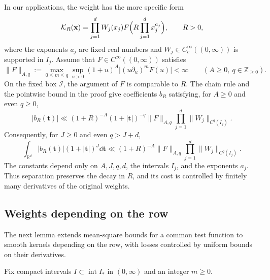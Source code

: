 In our applications, the weight has the more specific form
\[
 \mathcal K_R(\mathbf x)=\prod_{j=1}^dW_j(x_j)
 F\Bigl(R\prod_{j=1}^d x_j^{a_j}\Bigr),\qquad R>0,
\]
where the exponents $a_j$ are fixed real numbers and
$W_j\in C_c^\infty((0,\infty))$ is supported in $I_j$.
Assume that $F\in C^\infty((0,\infty))$ satisfies
\[
 \|F\|_{A,q}:=\max_{0\le m\le q}\sup_{u>0}
 (1+u)^A\bigl|(u\partial_u)^mF(u)\bigr|<\infty
 \qquad(A\ge0,\ q\in\mathbb Z_{\ge0}).
\]
On the fixed box $\mathcal I$, the argument of $F$ is comparable
to $R$. The chain rule and the pointwise bound in the proof give
coefficients $b_R$ satisfying, for $A\ge0$ and even $q\ge0$,
\begin{equation}\label{eq:smooth-pointwise}
 |b_R(\mathbf t)|
 \ll (1+R)^{-A}(1+|\mathbf t|)^{-q}\|F\|_{A,q}
       \prod_{j=1}^d\|W_j\|_{C^q(I_j)}.
\end{equation}
Consequently, for $J\ge0$ and even $q>J+d$,
\begin{equation}\label{eq:smooth-weight-bound}
 \int_{\mathbb R^d}|b_R(\mathbf t)|(1+|\mathbf t|)^J\dd\mathbf t
 \ll (1+R)^{-A}\|F\|_{A,q}
       \prod_{j=1}^d\|W_j\|_{C^q(I_j)}.
\end{equation}
The constants depend only on $A,J,q,d$, the intervals $I_j$, and
the exponents $a_j$. Thus separation preserves the decay in $R$,
and its cost is controlled by finitely many derivatives of the
original weights.

\subsection{Weights depending on the row}
The next lemma extends mean-square bounds for a common test
function to smooth kernels depending on the row, with losses controlled
by uniform bounds on their derivatives.

Fix compact intervals $I\subset\operatorname{int}I_*$ in $(0,\infty)$
and an integer $m\ge0$.

